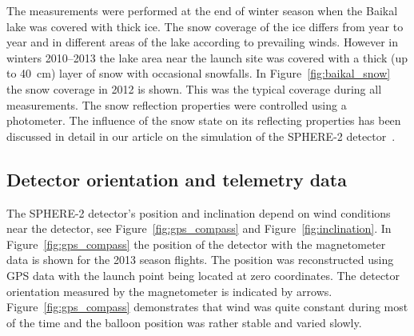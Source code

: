 \documentclass[universe,article,submit,moreauthors,pdftex]{Definitions/mdpi}
\begin{document}
The measurements were performed at the end of winter season when the Baikal lake was covered with thick ice. The snow coverage of the ice differs from year to year and in different areas of the lake according to prevailing winds. However in winters 2010--2013 the lake area near the launch site was covered with a thick (up to 40~cm) layer of snow with occasional snowfalls. In Figure~\ref{fig:baikal_snow} the snow coverage in 2012 is shown. This was the typical coverage during all measurements. The snow reflection properties were controlled using a photometer. The influence of the snow state on its reflecting properties has been discussed in detail in our article on the simulation of the SPHERE-2 detector~\cite{Ant19}.



 
\subsection{Detector orientation and telemetry data}
\label{sect:telemetrydata}

The \mbox{SPHERE-2} detector's position and inclination depend on wind conditions near the detector, see Figure~\ref{fig:gps_compass} and Figure~\ref{fig:inclination}. In Figure~\ref{fig:gps_compass} the position of the detector with the magnetometer data is shown for the 2013 season  flights. The position was reconstructed using GPS data with the launch point being located at zero coordinates. The detector orientation measured by the magnetometer is indicated by arrows. Figure~\ref{fig:gps_compass} demonstrates that wind was quite constant during most of the time and the balloon position was rather stable and varied slowly.  
\end{document}
